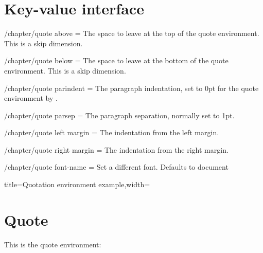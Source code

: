 \section{Key-value interface}


\begin{key}{/chapter/quote above = } The space to leave at the top of the quote environment. This is a skip dimension. 
\end{key}

\begin{key}{/chapter/quote below = } The space to leave at the bottom of the quote environment. This is a skip dimension. 
\end{key}
\begin{key}{/chapter/quote parindent = } The paragraph indentation, set to 0pt for the quote environment by
\latex.
\end{key}
\begin{key}{/chapter/quote parsep = } The paragraph separation, normally set to 1pt.
\end{key}
\begin{key}{/chapter/quote left margin = } The indentation from the left margin.
\end{key}
\begin{key}{/chapter/quote right margin = } The indentation from the right margin.
\end{key}

\begin{key}{/chapter/quote font-name = } Set a different font. Defaults to document 
\end{key}
\begin{tcblisting}{title=Quotation environment example,width=\textwidth}
\bgroup
{}
\lorem

\begin{quotation}
\lipsum[2-3]
\end{quotation}
\egroup
\end{tcblisting}

\section{Quote}
This is the quote environment:
\begin{quote}
\lipsum[1-2]
\end{quote}


